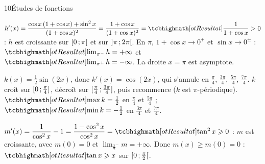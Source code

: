 \begin{corrige}{10}{Études de fonctions}
\noindent
\begin{minipage}[t]{0.52\linewidth}\vspace{0pt}\raggedright
\begin{questions}[start=3]
  \item $h'(x)=\dfrac{\cos x\,(1+\cos x)+\sin^{2}x}{(1+\cos x)^{2}}=\dfrac{1+\cos x}{(1+\cos x)^{2}}=\res{\dfrac{1}{1+\cos x}}>0$ :
    $h$ est croissante sur $\mathopen{[}0\,{;}\,\pi\mathclose{[}$ et sur $\mathopen{]}\pi\,{;}\,2\pi\mathclose{[}$. En $\pi$, $1+\cos x\to0^{+}$ et $\sin x\to0^{\pm}$ :
    $\res{\lim_{\pi^{-}}h=+\infty}$ et $\res{\lim_{\pi^{+}}h=-\infty}$. La droite $x=\pi$ est asymptote.
\end{questions}
\end{minipage}\hfill
\begin{minipage}[t]{0.44\linewidth}\vspace{1mm}
\centering
\begin{tableau}
\end{tableau}
\end{minipage}

\begin{questions}[start=4]
  \item $k(x)=\frac12\sin(2x)$, donc $k'(x)=\cos(2x)$, qui s'annule en $\frac{\pi}{4}$, $\frac{3\pi}{4}$, $\frac{5\pi}{4}$, $\frac{7\pi}{4}$.
    $k$ croît sur $\mathopen{[}0\,{;}\,\frac{\pi}{4}\mathclose{]}$, décroît sur $\mathopen{[}\frac{\pi}{4}\,{;}\,\frac{3\pi}{4}\mathclose{]}$, puis recommence ($k$ est $\pi$-périodique).
    $\res{\max k=\frac12}$ en $\frac{\pi}{4}$ et $\frac{5\pi}{4}$ ; $\res{\min k=-\frac12}$ en $\frac{3\pi}{4}$ et $\frac{7\pi}{4}$.
  \item $m'(x)=\dfrac{1}{\cos^{2}x}-1=\dfrac{1-\cos^{2}x}{\cos^{2}x}=\res{\tan^{2}x}\geq0$ : $m$ est croissante, avec $m(0)=0$ et
    $\lim_{\frac{\pi}{2}^{-}}m=+\infty$. Donc $m(x)\geq m(0)=0$ : $\res{\tan x\geq x}$ sur $\mathopen{[}0\,{;}\,\frac{\pi}{2}\mathclose{[}$.
\end{questions}
\end{corrige}

